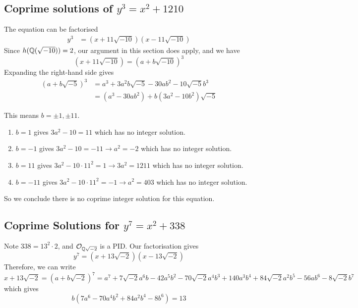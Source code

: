 \subsection{Coprime solutions of \texorpdfstring{$y^3 = x^2 + 1210$}{}}

The equation can be factorised 
\begin{align*}
	y^3 &= (x + 11\sqrt{-10})(x - 11\sqrt{-10})
\end{align*}
Since $h(\mathbb{Q}(\sqrt{-10})) = 2$, our argument in this section does apply, and we have 
$$
(x + 11 \sqrt{-10}) = (a + b\sqrt{-10})^3
$$
Expanding the right-hand side gives
\begin{align*}
	(a + b\sqrt{-5})^3 &= a^3 + 3a^2 b \sqrt{-5} - 30 a b^2 - 10 \sqrt{-5} b^3 \\ 
					   &= (a^3 - 30 a b^2) + b(3a^2 - 10b^2) \sqrt{-5}
\end{align*}

This means $b = \pm 1, \pm 11$.
\begin{enumerate}
	\item $b = 1$ gives $3a^2 - 10 = 11$ which has no integer solution. 
	\item $b = -1$ gives $3a^2 - 10 = -11 \rightarrow a^2 = -2$ which has no integer solution.
	\item $b = 11$ gives $3a^2 - 10 \cdot 11^2 = 1 \rightarrow 3a^2 = 1211$ which has no integer solution.
	\item $b = -11$ gives $3a^2 - 10 \cdot 11^2 = -1 \rightarrow a^2 = 403$ which has no integer solution.
\end{enumerate}
So we conclude there is no coprime integer solution for this equation.

\subsection{Coprime Solutions for \texorpdfstring{$y^7 = x^2 + 338$}{}}\label{sol:coprime-338}

Note $338  = 13^2 \cdot 2$, and $\mathcal{O}_{\mathbb{Q}{\sqrt{-2}}}$ is a PID.
Our factorisation gives 
$$
y^7 = (x + 13\sqrt{-2})(x - 13\sqrt{-2})
$$
Therefore, we can write 
\begin{dmath}
x + 13\sqrt{-2} = (a + b\sqrt{-2})^7
=a^{7} + 7 \sqrt{-2}  a^{6} b - 42 a^{5} b^{2} - 70 \sqrt{-2}  a^{4} b^{3} + 140 a^{3} b^{4} + 84 \sqrt{-2}  a^{2} b^{5} - 56 a b^{6} - 8 \sqrt{-2}  b^{7}
\end{dmath}
which gives 
$$
b(7 a^{6} - 70 a^{4} b^{2} + 84 a^{2} b^{4} - 8 b^{6}) = 13
$$


